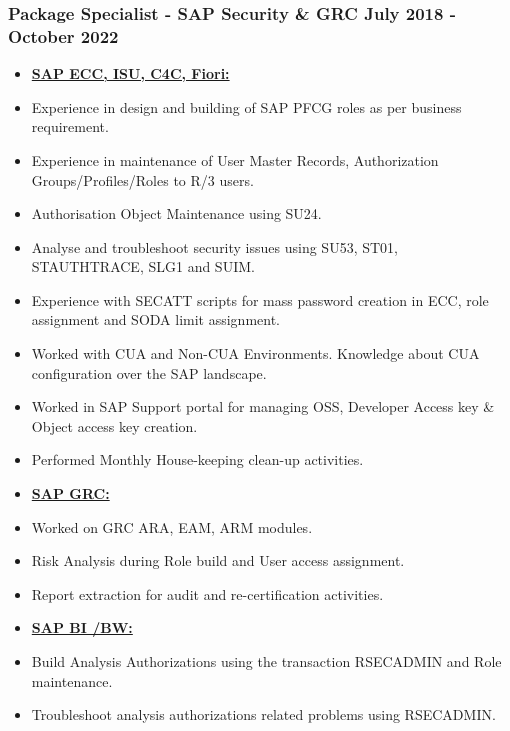 \documentclass[10pt]{article}
\begin{document}
\subsubsection{Package Specialist - SAP Security \& GRC \hfill  July 2018 - October 2022 \\}

	\begin{itemize}
		\small
     		\item[] \textbf{\underline{SAP ECC, ISU, C4C, Fiori:}} 
     			\item Experience in design and building of SAP PFCG roles as per business requirement.
				\item Experience in maintenance of User Master Records, Authorization Groups/Profiles/Roles to R/3 users.
				\item Authorisation Object Maintenance using SU24.
				\item Analyse and troubleshoot security issues using SU53, ST01, STAUTHTRACE, SLG1 and SUIM.
				\item Experience with SECATT scripts for mass password creation in ECC, role assignment and SODA limit assignment.
				\item Worked with CUA and Non-CUA Environments. Knowledge about %
					CUA configuration over the SAP landscape.
				\item Worked in SAP Support portal for managing OSS, Developer Access key \& Object access key creation.
				\item Performed Monthly House-keeping clean-up activities.
	\end{itemize}

	\begin{itemize}
		\small
     		\item[] \textbf{\underline{SAP GRC:}} 
        		\item Worked on GRC ARA, EAM, ARM modules.
				\item Risk Analysis during Role build and User access assignment. 
				\item Report extraction for audit and re-certification activities.
	\end{itemize}

	\begin{itemize}
		\small
     		\item[] \textbf{\underline{SAP BI /BW:}} 
        		\item Build Analysis Authorizations using the transaction RSECADMIN and Role maintenance.
				\item Troubleshoot analysis authorizations related problems using RSECADMIN.
	\end{itemize}
\end{document}
